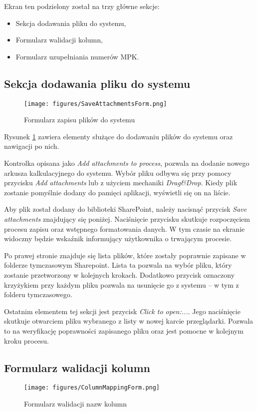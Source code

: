  Ekran ten podzielony został na trzy główne sekcje:
 \begin{itemize}
    \item Sekcja dodawania pliku do systemu,
    \item Formularz walidacji kolumn,
    \item Formularz uzupełniania numerów MPK.
 \end{itemize}

 \subsection*{Sekcja dodawania pliku do systemu}
 \begin{figure}[H]
     \centering
     \texttt{[image: figures/SaveAttachmentsForm.png]}
     \caption{Formularz zapisu plików do systemu}
     \label{fig:SaveAttachmentsForm}
 \end{figure}
 Rysunek \ref{fig:SaveAttachmentsForm} zawiera elementy służące do dodawaniu plików do systemu oraz nawigacji po nich.

 Kontrolka opisana jako \emph{Add attachments to process}, pozwala na dodanie nowego arkusza kalkulacyjnego do systemu. Wybór pliku odbywa się przy pomocy przycisku \emph{Add attachments} lub z użyciem mechaniki \emph{Drag\&Drop}. Kiedy plik zostanie pomyślnie dodany do pamięci aplikacji, wyświetli się on na liście.

 Aby plik został dodany do biblioteki SharePoint, należy nacisnąć przycisk \emph{Save attachments} znajdujący się poniżej. Naciśnięcie przycisku skutkuje rozpoczęciem procesu zapisu oraz wstępnego formatowania danych. W tym czasie na ekranie widoczny będzie wskaźnik informujący użytkownika o trwającym procesie.

 Po prawej stronie znajduje się lista plików, które zostały poprawnie zapisane w folderze tymczasowym Sharepoint. Lista ta pozwala na wybór pliku, który zostanie przetworzony w kolejnych krokach. Dodatkowo przycisk oznaczony krzyżykiem przy każdym pliku pozwala na usunięcie go z systemu -- w tym z folderu tymczasowego.
 
 Ostatnim elementem tej sekcji jest przycisk \emph{Click to open:...}.
 Jego naciśnięcie skutkuje otwarciem pliku wybranego z listy w nowej karcie przeglądarki. Pozwala to na weryfikację poprawności zapisanego pliku oraz jest pomocne w kolejnym kroku procesu.

\subsection{Formularz walidacji kolumn} 
  \begin{figure}[h]
     \centering
     \texttt{[image: figures/ColumnMappingForm.png]}
     \caption{Formularz walidacji nazw kolumn}
     \label{fig:columnmappingform}
 \end{figure}

